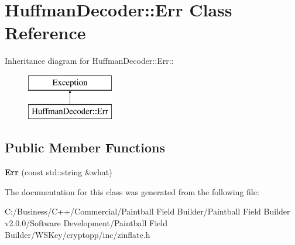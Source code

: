 \hypertarget{class_huffman_decoder_1_1_err}{
\section{HuffmanDecoder::Err Class Reference}
\label{class_huffman_decoder_1_1_err}
}
Inheritance diagram for HuffmanDecoder::Err::\begin{figure}[H]
\begin{center}
\leavevmode
\includegraphics[height=2cm]{class_huffman_decoder_1_1_err}
\end{center}
\end{figure}
\subsection*{Public Member Functions}
\begin{DoxyCompactItemize}
\item 
\hypertarget{class_huffman_decoder_1_1_err_a8d7a19c285d2e709945e8c398e173791}{
{\bfseries Err} (const std::string \&what)}
\label{class_huffman_decoder_1_1_err_a8d7a19c285d2e709945e8c398e173791}

\end{DoxyCompactItemize}


The documentation for this class was generated from the following file:\begin{DoxyCompactItemize}
\item 
C:/Business/C++/Commercial/Paintball Field Builder/Paintball Field Builder v2.0.0/Software Development/Paintball Field Builder/WSKey/cryptopp/inc/zinflate.h\end{DoxyCompactItemize}
